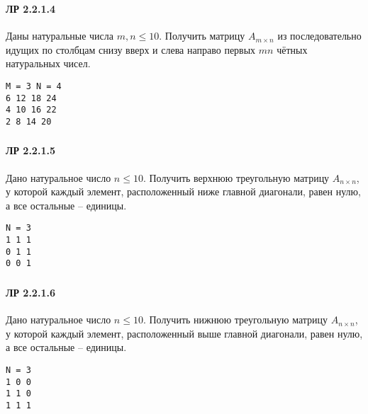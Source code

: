 \documentclass[12pt,a4paper]{report}
\begin{document}
\subsubsection*{} \noindent
\begin{minipage}{0.75\textwidth}
\paragraph*{ЛР 2.2.1.4} 
Даны натуральные числа $m,n \le 10$. Получить матрицу $A_{m \times n}$ из последовательно идущих по столбцам снизу вверх и слева направо первых $mn$ чётных натуральных чисел.
\end{minipage}
\hfill
\begin{minipage}{0.2\textwidth}
\begin{verbatim}
M = 3 N = 4
6 12 18 24
4 10 16 22
2 8 14 20
\end{verbatim}
\end{minipage}

\subsubsection*{} \noindent
\begin{minipage}{0.75\textwidth}
\paragraph*{ЛР 2.2.1.5} 
Дано натуральное число $n \le 10$. Получить верхнюю треугольную матрицу $A_{n \times n}$, у которой каждый элемент, расположенный ниже главной диагонали, равен нулю, а все остальные -- единицы.
\end{minipage}
\hfill
\begin{minipage}{0.2\textwidth}
\begin{verbatim}
N = 3
1 1 1
0 1 1
0 0 1
\end{verbatim}
\end{minipage}

\subsubsection*{} \noindent
\begin{minipage}{0.75\textwidth}
\paragraph*{ЛР 2.2.1.6} 
Дано натуральное число $n \le 10$. Получить нижнюю треугольную матрицу $A_{n \times n}$, у которой каждый элемент, расположенный выше главной диагонали, равен нулю, а все остальные -- единицы.
\end{minipage}
\hfill
\begin{minipage}{0.2\textwidth}
\begin{verbatim}
N = 3
1 0 0
1 1 0
1 1 1
\end{verbatim}
\end{minipage}
\end{document}
